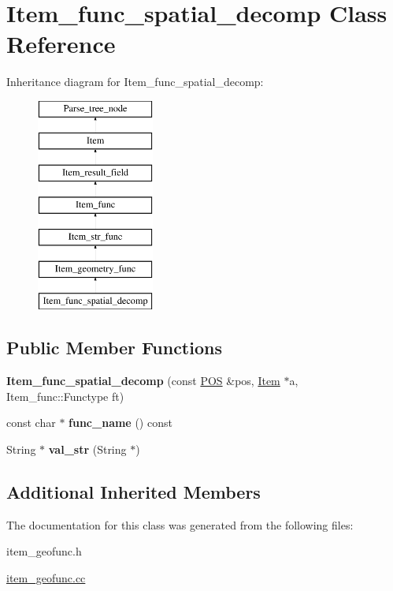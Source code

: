 \hypertarget{classItem__func__spatial__decomp}{}\section{Item\+\_\+func\+\_\+spatial\+\_\+decomp Class Reference}
\label{classItem__func__spatial__decomp}
Inheritance diagram for Item\+\_\+func\+\_\+spatial\+\_\+decomp\+:\begin{figure}[H]
\begin{center}
\leavevmode
\includegraphics[height=7.000000cm]{classItem__func__spatial__decomp}
\end{center}
\end{figure}
\subsection*{Public Member Functions}
\begin{DoxyCompactItemize}
\item 
\mbox{\label{classItem__func__spatial__decomp_a3d4bf7140f369d467124644b3d439073}} 
{\bfseries Item\+\_\+func\+\_\+spatial\+\_\+decomp} (const \mbox{\hyperlink{structYYLTYPE}{P\+OS}} \&pos, \mbox{\hyperlink{classItem}{Item}} $\ast$a, Item\+\_\+func\+::\+Functype ft)
\item 
\mbox{\label{classItem__func__spatial__decomp_ab2433fa326dfe73bb6a006fe896b5050}} 
const char $\ast$ {\bfseries func\+\_\+name} () const
\item 
\mbox{\label{classItem__func__spatial__decomp_a9b836fbfa7df419d31caec520033b1ad}} 
String $\ast$ {\bfseries val\+\_\+str} (String $\ast$)
\end{DoxyCompactItemize}
\subsection*{Additional Inherited Members}


The documentation for this class was generated from the following files\+:\begin{DoxyCompactItemize}
\item 
item\+\_\+geofunc.\+h\item 
\mbox{\hyperlink{item__geofunc_8cc}{item\+\_\+geofunc.\+cc}}\end{DoxyCompactItemize}
